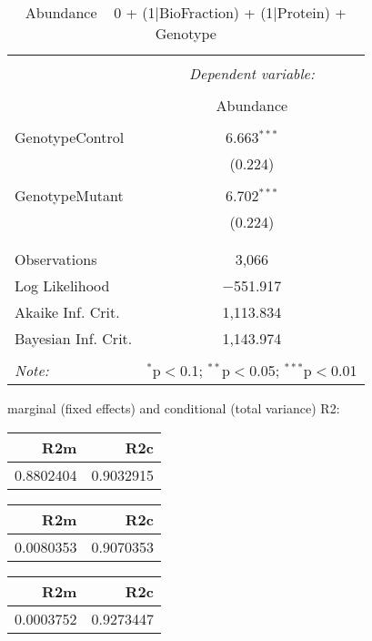 \documentclass[11pt]{report}
\begin{document}
\begin{table}[!htbp] \centering 
  \caption{Abundance ~ 0 + (1|BioFraction) + (1|Protein) + Genotype} 
  \label{} 
\begin{tabular}{@{\extracolsep{5pt}}lc} 
\\[-1.8ex]\hline 
\hline \\[-1.8ex] 
 & \multicolumn{1}{c}{\textit{Dependent variable:}} \\ 
\cline{2-2} 
\\[-1.8ex] & Abundance \\ 
\hline \\[-1.8ex] 
 GenotypeControl & 6.663$^{***}$ \\ 
  & (0.224) \\ 
  & \\ 
 GenotypeMutant & 6.702$^{***}$ \\ 
  & (0.224) \\ 
  & \\ 
\hline \\[-1.8ex] 
Observations & 3,066 \\ 
Log Likelihood & $-$551.917 \\ 
Akaike Inf. Crit. & 1,113.834 \\ 
Bayesian Inf. Crit. & 1,143.974 \\ 
\hline 
\hline \\[-1.8ex] 
\textit{Note:}  & \multicolumn{1}{r}{$^{*}$p$<$0.1; $^{**}$p$<$0.05; $^{***}$p$<$0.01} \\ 
\end{tabular} 
\end{table} 
marginal (fixed effects) and conditional (total variance) R2:

\begin{tabular}{r|r}
\hline
R2m & R2c\\
\hline
0.8802404 & 0.9032915\\
\hline
\end{tabular}

\begin{tabular}{r|r}
\hline
R2m & R2c\\
\hline
0.0080353 & 0.9070353\\
\hline
\end{tabular}

\begin{tabular}{r|r}
\hline
R2m & R2c\\
\hline
0.0003752 & 0.9273447\\
\hline
\end{tabular}
\end{document}
